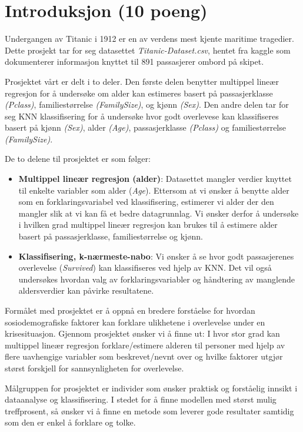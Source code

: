 \section{Introduksjon (10 poeng)}\label{introduksjon-10-poeng}
Undergangen av Titanic i 1912 er en av verdens mest kjente maritime tragedier. Dette prosjekt tar for seg datasettet \textit{Titanic-Dataset.csv}, hentet fra kaggle \parencite[]{titanic_dataset} som dokumenterer informasjon knyttet til 891 passasjerer ombord på skipet.

Prosjektet vårt er delt i to deler. Den første delen benytter multippel lineær regresjon for å undersøke om alder kan estimeres basert på passasjerklasse \textit{(Pclass)}, familiestørrelse \textit{(FamilySize)}, og kjønn \textit{(Sex)}. 
Den andre delen tar for seg KNN klassifisering for å undersøke hvor godt overlevese kan klassifiseres basert på kjønn \textit{(Sex)}, alder \textit{(Age)}, passasjerklasse \textit{(Pclass)} og familiestørrelse \textit{(FamilySize)}. 
 
De to delene til prosjektet er som følger:
\begin{itemize}
    \item \textbf{Multippel lineær regresjon (alder)}: Datasettet mangler verdier knyttet til enkelte variabler som alder (\textit{Age}). Ettersom at vi ønsker å benytte alder som en forklaringsvariabel ved klassifisering, estimerer vi alder der den mangler slik at vi kan få et bedre datagrunnlag. Vi ønsker derfor å undersøke i hvilken grad multippel lineær regresjon kan brukes til å estimere alder basert på passasjerklasse, familiestørrelse og kjønn.
    \item \textbf{Klassifisering, k-nærmeste-nabo}: Vi ønsker å se hvor godt passasjerenes overlevelse (\textit{Survived}) kan klassifiseres ved hjelp av KNN. Det vil også undersøkes hvordan valg av forklaringsvariabler og håndtering av manglende aldersverdier kan påvirke resultatene.
\end{itemize}

Formålet med prosjektet er å oppnå en bredere forståelse for hvordan sosiodemografiske faktorer kan forklare ulikhetene i overlevelse under en krisesituasjon. Gjennom prosjektet ønsker vi å finne ut: I hvor stor grad kan multippel lineær regresjon forklare/estimere alderen til personer med hjelp av flere uavhengige variabler som beskrevet/nevnt over og hvilke faktorer utgjør størst forskjell for sannsynligheten for overlevelse.

Målgruppen for prosjektet er individer som ønsker praktisk og forståelig innsikt i dataanalyse og klassifisering. I stedet for å finne modellen med størst mulig treffprosent, så ønsker vi å finne en metode som leverer gode resultater samtidig som den er enkel å forklare og tolke.
